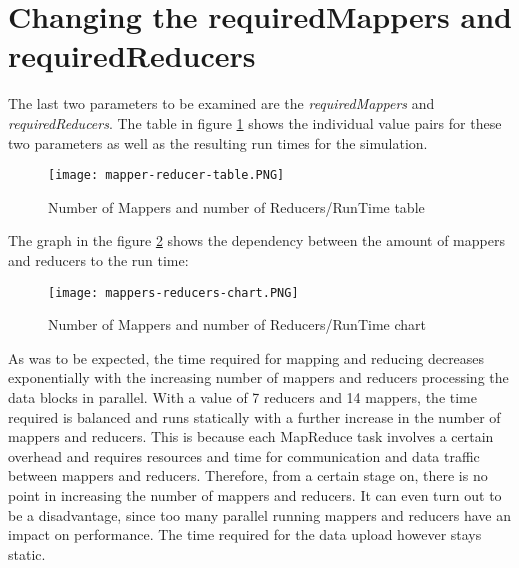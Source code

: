 \section{Changing the requiredMappers and requiredReducers}
The last two parameters to be examined are the \textit{requiredMappers} and \textit{requiredReducers}. The table in figure \ref{mapper-reducer-table} shows the individual value pairs for these two parameters as well as the resulting run times for the simulation.
\begin{figure}[H]
	\centering
	\texttt{[image: mapper-reducer-table.PNG]}
	\caption[Caption for LOF]{Number of Mappers and number of Reducers/RunTime table}
	\label{mapper-reducer-table}
\end{figure}
The graph in the figure \ref{mappers-reducers-chart} shows the dependency between the amount of mappers and reducers to the run time:
\begin{figure}[H]
	\centering
	\texttt{[image: mappers-reducers-chart.PNG]}
	\caption[Caption for LOF]{Number of Mappers and number of Reducers/RunTime chart}
	\label{mappers-reducers-chart}
\end{figure}
As was to be expected, the time required for mapping and reducing decreases exponentially with the increasing number of mappers and reducers processing the data blocks in parallel. With a value of 7 reducers and 14 mappers, the time required is balanced and runs statically with a further increase in the number of mappers and reducers. This is because each MapReduce task involves a certain overhead and requires resources and time for communication and data traffic between mappers and reducers. Therefore, from a certain stage on, there is no point in increasing the number of mappers and reducers. It can even turn out to be a disadvantage, since too many parallel running mappers and reducers have an impact on performance. The time required for the data upload however stays static.
